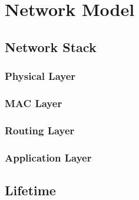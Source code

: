 
\chapter{Network Model} %
\label{cha:network_model}

\section{Network Stack} %
\label{sec:network_stack}

\subsection{Physical Layer} %
\label{sub:physical_layer}

\lipsum


\subsection{MAC Layer} %
\label{sub:mac_layer}

\lipsum


\subsection{Routing Layer} %
\label{sub:routing_layer}

\lipsum


\subsection{Application Layer} %
\label{sub:application_layer}

\lipsum



\section{Lifetime} %
\label{sec:lifetime}

\lipsum


